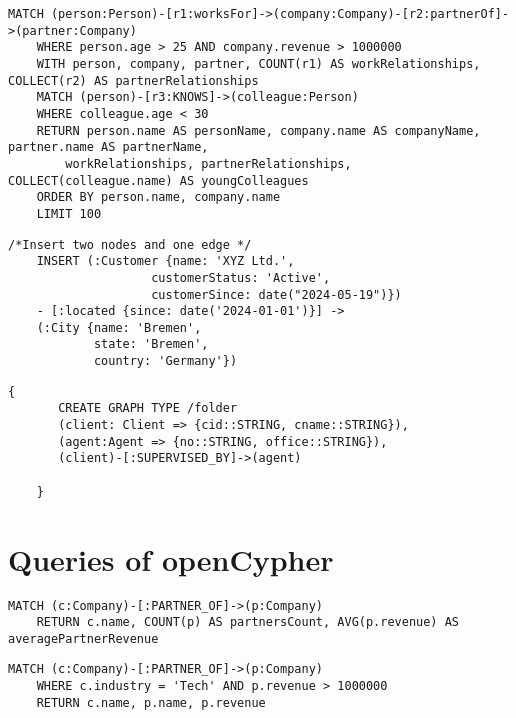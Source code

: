 \begin{lstlisting}[caption={Example for a complex quantified graph pattern (Benchmark)}, label={lst:benchmark}]
    MATCH (person:Person)-[r1:worksFor]->(company:Company)-[r2:partnerOf]->(partner:Company)
	WHERE person.age > 25 AND company.revenue > 1000000
	WITH person, company, partner, COUNT(r1) AS workRelationships, COLLECT(r2) AS partnerRelationships
	MATCH (person)-[r3:KNOWS]->(colleague:Person)
	WHERE colleague.age < 30
	RETURN person.name AS personName, company.name AS companyName, partner.name AS partnerName, 
		workRelationships, partnerRelationships, COLLECT(colleague.name) AS youngColleagues
	ORDER BY person.name, company.name
	LIMIT 100
\end{lstlisting}

\begin{lstlisting}[caption={Complex insert statement}, label={lst:complexInsertStatement}]
    /*Insert two nodes and one edge */
	INSERT (:Customer {name: 'XYZ Ltd.', 
					customerStatus: 'Active',
					customerSince: date("2024-05-19")})
	- [:located {since: date('2024-01-01')}] ->
	(:City {name: 'Bremen',
			state: 'Bremen',
			country: 'Germany'})
\end{lstlisting}

\begin{lstlisting}[caption={Concept of a graph type}, label={lst:graphType}] 
    {
       CREATE GRAPH TYPE /folder
       (client: Client => {cid::STRING, cname::STRING}),
       (agent:Agent => {no::STRING, office::STRING}),
       (client)-[:SUPERVISED_BY]->(agent)

    }
\end{lstlisting}


\section{Queries of openCypher}

\begin{lstlisting}[caption={Aggregation and Functions in openCypher}, label={lst:aggregationFunctionsOC}]
	MATCH (c:Company)-[:PARTNER_OF]->(p:Company)
	RETURN c.name, COUNT(p) AS partnersCount, AVG(p.revenue) AS averagePartnerRevenue
\end{lstlisting}

\begin{lstlisting}[caption={Expressive Filtering in openCypher with Company Nodes}, label={lst:companyExpressiveFilteringOC}]
	MATCH (c:Company)-[:PARTNER_OF]->(p:Company)
	WHERE c.industry = 'Tech' AND p.revenue > 1000000
	RETURN c.name, p.name, p.revenue
\end{lstlisting}


